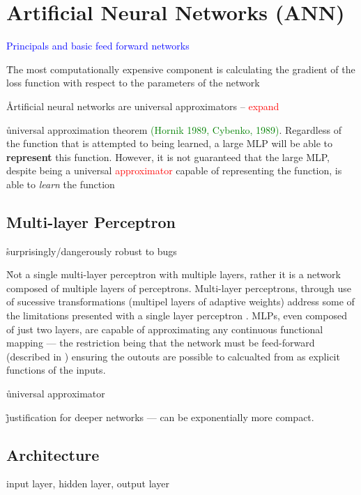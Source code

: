 \section{Artificial Neural Networks (ANN)}

\textcolor{blue}{Principals and basic feed forward networks}

\r{The most computationally expensive component is calculating the gradient of the loss function with respect to the parameters of the network}

\r{Artificial neural networks are {universal approximators} -- \textcolor{red}{expand}}

\r{universal approximation theorem \textcolor{green}{(Hornik 1989, Cybenko, 1989)}. Regardless of the function that is attempted to being learned, a large MLP will be able to \textbf{represent} this function. However, it is not guaranteed that the large MLP, despite being a universal \textcolor{red}{approximator} capable of representing the function, is able to \textit{learn} the function}


\subsection{Multi-layer Perceptron}

\r{surprisingly/dangerously robust to bugs}

\r{Not a single multi-layer perceptron with multiple layers, rather it is a network composed of multiple layers of perceptrons. Multi-layer perceptrons, through use of sucessive transformations (multipel layers of adaptive weights) address some of the limitations presented with a single layer perceptron .  MLPs, even composed of just two layers, are capable of approximating any continuous functional mapping --- the restriction being that the network must be feed-forward (described in ) ensuring the outouts are possible to calcualted from as explicit functions of the inputs.}

\r{universal approximator\cite{hornik1991approximation}}

\r{justification for deeper networks --- can be exponentially more compact.}

\subsection{Architecture}

\r{{input layer}, {hidden layer}, {output layer}}

